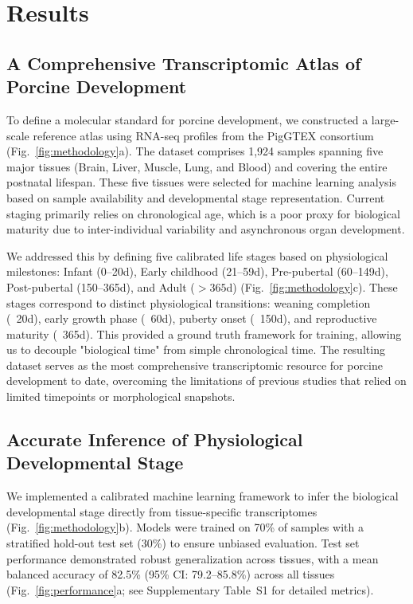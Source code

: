 \section{Results}

\subsection{A Comprehensive Transcriptomic Atlas of Porcine Development}

To define a molecular standard for porcine development, we constructed a large-scale reference atlas using RNA-seq profiles from the PigGTEX consortium (Fig.~\ref{fig:methodology}a). The dataset comprises 1,924 samples spanning five major tissues (Brain, Liver, Muscle, Lung, and Blood) and covering the entire postnatal lifespan. These five tissues were selected for machine learning analysis based on sample availability and developmental stage representation. Current staging primarily relies on chronological age, which is a poor proxy for biological maturity due to inter-individual variability and asynchronous organ development.

 We addressed this by defining five calibrated life stages based on physiological milestones: Infant (0--20d), Early childhood (21--59d), Pre-pubertal (60--149d), Post-pubertal (150--365d), and Adult ($>365$d) (Fig.~\ref{fig:methodology}c). These stages correspond to distinct physiological transitions: weaning completion (~20d), early growth phase (~60d), puberty onset (~150d), and reproductive maturity (~365d). This provided a ground truth framework for training, allowing us to decouple "biological time" from simple chronological time. The resulting dataset serves as the most comprehensive transcriptomic resource for porcine development to date, overcoming the limitations of previous studies that relied on limited timepoints or morphological snapshots.

\subsection{Accurate Inference of Physiological Developmental Stage}

We implemented a calibrated machine learning framework to infer the biological developmental stage directly from tissue-specific transcriptomes (Fig.~\ref{fig:methodology}b). Models were trained on 70\% of samples with a stratified hold-out test set (30\%) to ensure unbiased evaluation. Test set performance demonstrated robust generalization across tissues, with a mean balanced accuracy of 82.5\% (95\% CI: 79.2--85.8\%) across all tissues (Fig.~\ref{fig:performance}a; see Supplementary Table~S1 for detailed metrics).

